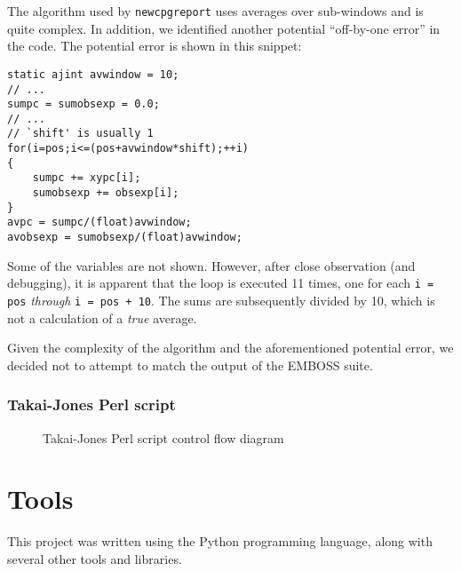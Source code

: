 \documentclass{bioinfo}
\begin{document}
The algorithm used by \texttt{newcpgreport} uses averages over
sub-windows and is quite complex. In addition, we identified another
potential ``off-by-one error'' in the code. The potential error is
shown in this snippet:

\begin{verbatim}
static ajint avwindow = 10;
// ...
sumpc = sumobsexp = 0.0;
// ...
// `shift' is usually 1
for(i=pos;i<=(pos+avwindow*shift);++i)
{
    sumpc += xypc[i];
    sumobsexp += obsexp[i];
}
avpc = sumpc/(float)avwindow;
avobsexp = sumobsexp/(float)avwindow;
\end{verbatim}

Some of the variables are not shown. However, after close observation
(and debugging), it is apparent that the loop is executed 11 times,
one for each \verb|i = pos| \emph{through} \verb|i = pos + 10|. The
sums are subsequently divided by 10, which is not a calculation of a
\emph{true} average.

Given the complexity of the algorithm and the aforementioned potential
error, we decided not to attempt to match the output of the EMBOSS
suite.

\subsubsection{Takai-Jones Perl script}

\begin{figure}[H]
  \label{fig:tj-flow}
  \caption{Takai-Jones Perl script control flow diagram}
  \begin{dot2tex}[scale=0.3]
    
  \end{dot2tex}
\end{figure}

\section{Tools}

This project was written using the Python programming language, along with several other tools and libraries.
\end{document}
